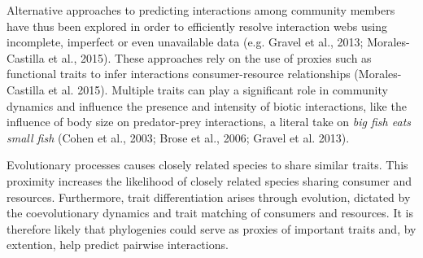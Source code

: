 \documentclass[letterpaper]{article}
\begin{document}




Alternative approaches to predicting interactions among community members have thus been explored in order to efficiently resolve interaction webs using incomplete, imperfect or even unavailable data (e.g. Gravel et al., 2013; Morales-Castilla et al., 2015). These approaches rely on the use of proxies such as functional traits to infer interactions consumer-resource relationships (Morales-Castilla et al. 2015). Multiple traits can play a significant role in community dynamics and influence the presence and intensity of biotic interactions, like the influence of body size on predator-prey interactions, a literal take on \textit{big fish eats small fish} (Cohen et al., 2003; Brose et al., 2006; Gravel et al. 2013).

Evolutionary processes causes closely related species to share similar traits. This proximity increases the likelihood of closely related species sharing consumer and resources. Furthermore, trait differentiation arises through evolution, dictated by the coevolutionary dynamics and trait matching of consumers and resources. It is therefore likely that phylogenies could serve as proxies of important traits and, by extention, help predict pairwise interactions.
\end{document}
